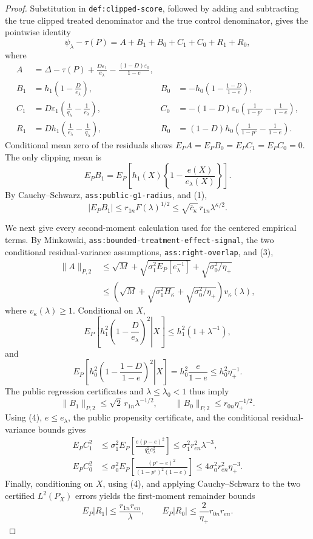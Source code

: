 \documentclass{article}
\begin{document}
\begin{proof}
Substitution in \texttt{def:clipped-score}, followed by adding and subtracting
the true clipped treated denominator and the true control denominator, gives
the pointwise identity
\[
\psi_\lambda-\tau(P)=A+B_1+B_0+C_1+C_0+R_1+R_0,                    \tag{5}
\]
where
\[
\begin{aligned}
A&=\Delta-\tau(P)+\frac{D\varepsilon_1}{e_\lambda}
-\frac{(1-D)\varepsilon_0}{1-e},\\
B_1&=h_1\left(1-\frac D{e_\lambda}\right),
&B_0&=-h_0\left(1-\frac{1-D}{1-e}\right),\\
C_1&=D\varepsilon_1\left(\frac1{q_\lambda}-\frac1{e_\lambda}\right),
&C_0&=-(1-D)\varepsilon_0
\left(\frac1{1-p^\circ}-\frac1{1-e}\right),\\
R_1&=Dh_1\left(\frac1{e_\lambda}-\frac1{q_\lambda}\right),
&R_0&=(1-D)h_0
\left(\frac1{1-p^\circ}-\frac1{1-e}\right).
\end{aligned}                                                       \tag{6}
\]
Conditional mean zero of the residuals shows
\(E_PA=E_PB_0=E_PC_1=E_PC_0=0\).  The only clipping mean is
\[
E_PB_1
=E_P\!\left[h_1(X)\left\{1-\frac{e(X)}{e_\lambda(X)}\right\}\right].
\]
By Cauchy--Schwarz, \texttt{ass:public-g1-radius}, and (1),
\[
|E_PB_1|
\leq r_{1n}F(\lambda)^{1/2}
\leq\sqrt{\overline c_\kappa}\,r_{1n}\lambda^{\kappa/2}.          \tag{7}
\]

We next give every second-moment calculation used for the centered empirical
terms.  By Minkowski, \texttt{ass:bounded-treatment-effect-signal}, the two
conditional residual-variance assumptions, \texttt{ass:right-overlap}, and
(3),
\[
\begin{split}
\|A\|_{P,2}
&\leq\sqrt M
+\sqrt{\sigma_1^2E_P[e_\lambda^{-1}]}
+\sqrt{\sigma_0^2/\eta_+}\\
&\leq
\left(\sqrt M+\sqrt{\sigma_1^2H_\kappa}
+\sqrt{\sigma_0^2/\eta_+}\right)v_\kappa(\lambda),
\end{split} \tag{8}
\]
where \(v_\kappa(\lambda)\geq1\).  Conditional on \(X\),
\[
E_P\!\left[\left.h_1^2\left(1-\frac D{e_\lambda}\right)^2
\right|X\right]
\leq h_1^2(1+\lambda^{-1}),
\]
and
\[
E_P\!\left[\left.h_0^2\left(1-\frac{1-D}{1-e}\right)^2
\right|X\right]
=h_0^2\frac e{1-e}\leq h_0^2\eta_+^{-1}.
\]
The public regression certificates and \(\lambda\leq\lambda_0<1\) thus imply
\[
\|B_1\|_{P,2}\leq\sqrt2\,r_{1n}\lambda^{-1/2},
\qquad
\|B_0\|_{P,2}\leq r_{0n}\eta_+^{-1/2}.                            \tag{9}
\]
Using (4), \(e\leq e_\lambda\), the public propensity certificate, and the
conditional residual-variance bounds gives
\[
\begin{split}
E_PC_1^2
&\leq\sigma_1^2E_P\!\left[
\frac{e(p-e)^2}{q_\lambda^2e_\lambda^2}\right]
\leq\sigma_1^2r_{en}^2\lambda^{-3},\\
E_PC_0^2
&\leq\sigma_0^2E_P\!\left[
\frac{(p^\circ-e)^2}{(1-p^\circ)^2(1-e)}\right]
\leq4\sigma_0^2r_{en}^2\eta_+^{-3}.
\end{split} \tag{10}
\]
Finally, conditioning on \(X\), using (4), and applying Cauchy--Schwarz to the
two certified \(L^2(P_X)\) errors yields the first-moment remainder bounds
\[
E_P|R_1|\leq\frac{r_{1n}r_{en}}\lambda,
\qquad
E_P|R_0|\leq\frac2{\eta_+}r_{0n}r_{en}.                             \tag{11}
\]


\end{proof}
\end{document}
